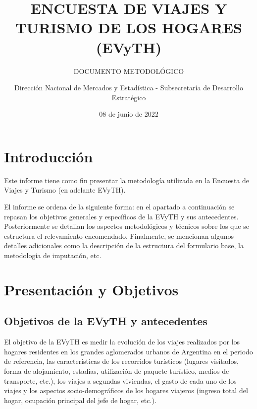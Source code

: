 \documentclass[
  openany]{book}
\title{ENCUESTA DE VIAJES Y TURISMO DE LOS HOGARES (EVyTH)}
\subtitle{DOCUMENTO METODOLÓGICO}
\author{Dirección Nacional de Mercados y Estadística - Subsecretaría de Desarrollo Estratégico}
\date{08 de junio de 2022}
\let\oldmaketitle\maketitle
\begin{document}
\maketitle


\newpage

\let\maketitle\oldmaketitle
\maketitle

{
\setcounter{tocdepth}{1}
\tableofcontents
}
\hypertarget{introducciuxf3n}{%
\chapter*{Introducción}\label{introducciuxf3n}}

Este informe tiene como fin presentar la metodología utilizada en la Encuesta de Viajes y Turismo (en adelante EVyTH).

El informe se ordena de la siguiente forma: en el apartado a continuación se repasan los objetivos generales y específicos de la EVyTH y sus antecedentes. Posteriormente se detallan los aspectos metodológicos y técnicos sobre los que se estructura el relevamiento encomendado. Finalmente, se mencionan algunos detalles adicionales como la descripción de la estructura del formulario base, la metodología de imputación, etc.

\hypertarget{presentacion-objetivos}{%
\chapter{\texorpdfstring{\textbf{Presentación y Objetivos}}{Presentación y Objetivos}}\label{presentacion-objetivos}}

\hypertarget{objetivos-de-la-evyth-y-antecedentes}{%
\section{Objetivos de la EVyTH y antecedentes}\label{objetivos-de-la-evyth-y-antecedentes}}

El objetivo de la EVyTH es medir la evolución de los viajes realizados por los hogares residentes en los grandes aglomerados urbanos de Argentina en el periodo de referencia, las características de los recorridos turísticos (lugares visitados, forma de alojamiento, estadías, utilización de paquete turístico, medios de transporte, etc.), los viajes a segundas viviendas, el gasto de cada uno de los viajes y los aspectos socio-demográficos de los hogares viajeros (ingreso total del hogar, ocupación principal del jefe de hogar, etc.).
\end{document}
